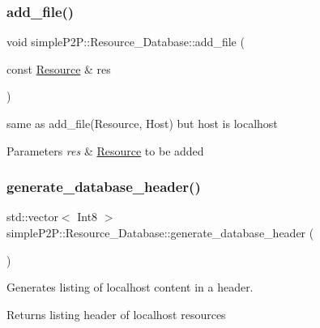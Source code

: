 \subsubsection{\texorpdfstring{add\+\_\+file()}{add\_file()}\hspace{0.1cm}{\footnotesize\ttfamily [2/2]}}
{\footnotesize\ttfamily void simple\+P2\+P\+::\+Resource\+\_\+\+Database\+::add\+\_\+file (\begin{DoxyParamCaption}\item[{const \hyperlink{classsimpleP2P_1_1Resource}{Resource} \&}]{res }\end{DoxyParamCaption})\hspace{0.3cm}{\ttfamily [inline]}}



same as add\+\_\+file(\+Resource, Host) but host is localhost 


\begin{DoxyParams}{Parameters}
{\em res} & \hyperlink{classsimpleP2P_1_1Resource}{Resource} to be added \\
\hline
\end{DoxyParams}
\mbox{\label{classsimpleP2P_1_1Resource__Database_a3c226a6c72d0796cc9b86bda01502cbf}} 
\subsubsection{\texorpdfstring{generate\+\_\+database\+\_\+header()}{generate\_database\_header()}}
{\footnotesize\ttfamily std\+::vector$<$ Int8 $>$ simple\+P2\+P\+::\+Resource\+\_\+\+Database\+::generate\+\_\+database\+\_\+header (\begin{DoxyParamCaption}{ }\end{DoxyParamCaption})}



Generates listing of localhost content in a header. 

\begin{DoxyReturn}{Returns}
listing header of localhost resources 
\end{DoxyReturn}
\mbox{\label{classsimpleP2P_1_1Resource__Database_a2a6cd0b6da11176aec9ef7f218ac1c62}} 

